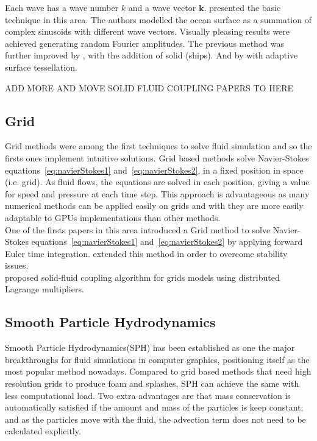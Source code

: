 Each wave has a wave number $k$ and a wave vector $\mathbf{k}$.
\cite{Tessendorf2001} presented the basic technique in this area.
The authors modelled the ocean surface as a summation of complex sinusoids with different wave vectors.
Visually pleasing results were achieved generating random Fourier amplitudes.
The previous method was further improved by \cite{Cieutat2003}, with the addition of solid (ships).
And by \cite{Chiu2006} with adaptive surface tessellation.


ADD MORE AND MOVE SOLID FLUID COUPLING PAPERS TO HERE

\subsection{Grid}

Grid methods were among the first techniques to solve fluid simulation and so the firsts ones implement intuitive solutions.
Grid based methods solve Navier-Stokes equations~\ref{eq:navierStokes1} and~\ref{eq:navierStokes2}, in a fixed position in space (i.e. grid).
As fluid flows, the equations are solved in each position, giving a value for speed and pressure at each time step.
This approach is advantageous as many numerical methods can be applied easily on grids and with they are more easily adaptable to GPUs implementations than other methods.\\

One of the firsts papers in this area introduced a Grid method \cite{Foster1996} to solve Navier-Stokes equations~\ref{eq:navierStokes1} and~\ref{eq:navierStokes2} by applying forward Euler time integration. 
\cite{Stam1999} extended this method in order to overcome stability issues.\\

\cite{Carlson2004} proposed solid-fluid coupling algorithm for grids models using distributed Lagrange multipliers.

\subsection{Smooth Particle Hydrodynamics}

Smooth Particle Hydrodynamics(SPH) has been established as one the major breakthroughs for fluid simulations in computer graphics, positioning itself as the most popular method nowadays.
Compared to grid based methods that need high resolution grids to produce foam and splashes, SPH can achieve the same with less computational load.
Two extra advantages are that mass conservation is automatically satisfied if the amount and mass of the particles is keep constant;
and as the particles move with the fluid, the advection term does not need to be calculated explicitly.\\

